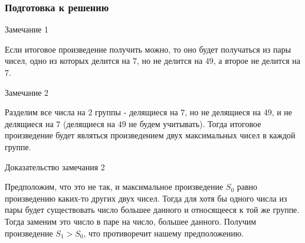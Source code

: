 \documentclass{beamer}
\begin{document}
\begin{frame}

    \frametitle{Подготовка к решению}

    {\footnotesize

    \begin{block}{Замечание 1}

        Если итоговое произведение получить можно, то оно будет получаться из пары чисел, одно из которых делится на $7$, но не делится на $49$, а второе не делится на $7$.

    \end{block}

    \pause

    \begin{block}{Замечание 2}

        Разделим все числа на $2$ группы - делящиеся на $7$, но не делящиеся на $49$, и не делящиеся на $7$ (делящиеся на $49$ не будем учитывать). Тогда итоговое произведение будет являться произведением двух максимальных чисел в каждой группе.

    \end{block}

    \pause

    \begin{alertblock}{Доказательство замечания 2}

        Предположим, что это не так, и максимальное произведение $S_0$ равно произведению каких-то других двух чисел. Тогда для хотя бы одного числа из пары будет существовать число большее данного и относящееся к той же группе. Тогда заменим это число в паре на число, большее данного. Получим произведение $S_1 > S_0$, что противоречит нашему предположению.

    \end{alertblock}

    }

\end{frame}
\end{document}

